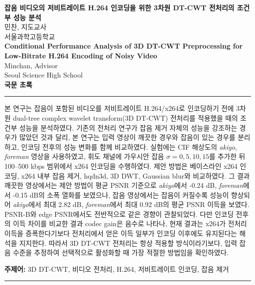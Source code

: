 \documentclass[10pt]{article}
\begin{document}
\begin{center}
{\LARGE \bf 잡음 비디오의 저비트레이트 H.264 인코딩을 위한 3차원 DT-CWT 전처리의 조건부 성능 분석}\\[12pt]
민찬, 지도교사\\
서울과학고등학교\\[12pt]
{\LARGE \bf Conditional Performance Analysis of 3D DT-CWT Preprocessing for Low-Bitrate H.264 Encoding of Noisy Video}\\[12pt]
Minchan, Advisor\\
Seoul Science High School\\[12pt]

{\large \bf 국문 초록}
\noindent\rule{\textwidth}{0.4pt}
\begin{flushleft}
본 연구는 잡음이 포함된 비디오를 저비트레이트 H.264/x264로 인코딩하기 전에 3차원 dual-tree complex wavelet transform(3D DT-CWT) 전처리를 적용했을 때의 조건부 성능을 분석하였다. 기존의 전처리 연구가 잡음 제거 자체의 성능을 강조하는 경우가 많았던 것과 달리, 본 연구는 입력 영상이 깨끗한 경우와 잡음이 있는 경우를 분리하고, 인코딩 전후의 성능 변화를 함께 비교하였다. 실험에는 CIF 해상도의 \textit{akiyo}, \textit{foreman} 영상을 사용하였고, 휘도 채널에 가우시안 잡음 $\sigma=0,5,10,15$를 추가한 뒤 100--500 kbps 범위에서 x264 인코딩을 수행하였다. 제안 방법은 베이스라인 x264 인코딩, x264 내부 잡음 제거, hqdn3d, 3D DWT, Gaussian blur와 비교하였다. 그 결과 깨끗한 영상에서는 제안 방법이 평균 PSNR 기준으로 \textit{akiyo}에서 -0.24 dB, \textit{foreman}에서 -0.15 dB의 소폭 열화를 보였으나, 잡음 영상에서는 잡음이 커질수록 성능이 향상되어 \textit{akiyo}에서 최대 2.82 dB, \textit{foreman}에서 최대 0.92 dB의 평균 PSNR 이득을 보였다. PSNR-B와 edge PSNR에서도 전반적으로 같은 경향이 관찰되었다. 다만 인코딩 전후의 이득 차이를 비교한 결과 codec gain은 음수로 나타나, 현재 결과는 x264가 전처리 이득을 증폭한다기보다 전처리에서 얻은 이득 일부가 인코딩 이후에도 유지된다는 해석을 지지한다. 따라서 3D DT-CWT 전처리는 항상 적용할 방식이라기보다, 입력 잡음 수준을 추정하여 선택적으로 활성화할 때 가장 적절한 방법임을 확인하였다.

\textbf{주제어:} 3D DT-CWT, 비디오 전처리, H.264, 저비트레이트 인코딩, 잡음 제거
\noindent\rule{\textwidth}{0.4pt}
\end{flushleft}


\end{center}
\end{document}

